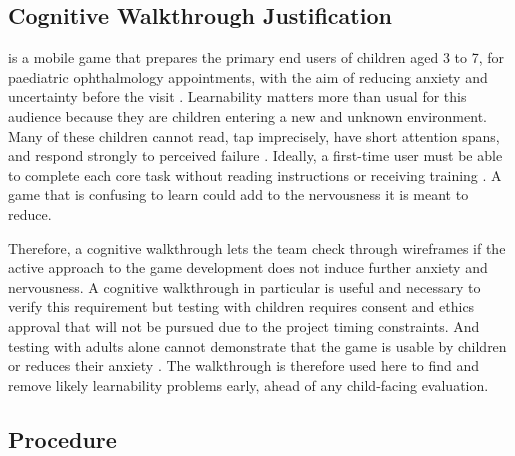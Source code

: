 \documentclass{article}
\begin{document}
\subsection{\progname{} Cognitive Walkthrough Justification}

\progname{} is a mobile game that prepares the primary end users of children aged 3 to 7, for 
paediatric ophthalmology appointments, with the aim of reducing anxiety and uncertainty 
before the visit \cite{SRS}. Learnability matters more than usual for this audience because 
they are children entering a new and unknown environment. Many of these children cannot read, 
tap imprecisely, have short attention spans, and respond strongly to perceived failure \cite{SRS}. 
Ideally, a first-time user must be able to complete each core task without reading instructions 
or receiving training \cite{SRS}. A game that is confusing to learn could add to the nervousness 
it is meant to reduce.

Therefore, a cognitive walkthrough lets the team check through wireframes if the active approach 
to the game development does not induce further anxiety and nervousness. A cognitive walkthrough 
in particular is useful and necessary to verify this requirement but testing with children requires 
consent and ethics approval that will not be pursued due to the project timing constraints. And testing 
with adults alone cannot demonstrate that the game is usable by children or reduces their anxiety 
\cite{SRS}. The walkthrough is therefore used here to find and remove likely learnability problems 
early, ahead of any child-facing evaluation.

\subsection{Procedure}
\end{document}
